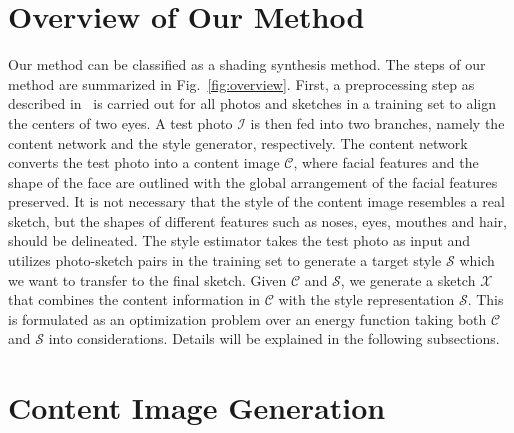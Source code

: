 \documentclass[10pt,twocolumn,letterpaper]{article}
\begin{document}
{
\section{Overview of Our Method}
}
Our method can be classified as a shading synthesis method. The steps of our method are summarized in Fig.~\ref{fig:overview}. First, a preprocessing step as described in~\cite{wang2009face} is carried out for all photos and sketches in a training set to align the centers of two eyes. A test photo $\mathcal{I}$ is then fed into two branches, namely the content network and the style generator, respectively. The content network converts the test photo into a content image $\mathcal{C}$, where facial features and the shape of the face are outlined with the global arrangement of the facial features preserved. It is not necessary that the style of the content image resembles a real sketch, but the shapes of different features such as noses, eyes, mouthes and hair, should be delineated. The style estimator takes the test photo as input and utilizes photo-sketch pairs in the training set to generate a target style $\mathcal{S}$ which we want to transfer to the final sketch. Given $\mathcal{C}$ and $\mathcal{S}$, we generate a sketch $\mathcal{X}$ that combines the content information in $\mathcal{C}$ with the style representation $\mathcal{S}$. This is formulated as an optimization problem over an energy function taking both $\mathcal{C}$ and $\mathcal{S}$ into considerations. Details will be explained in the following subsections.
{
\section{Content Image Generation}
}
\end{document}
